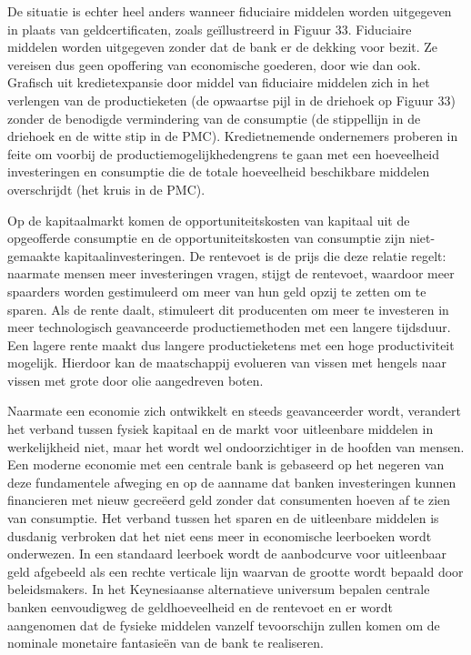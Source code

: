 De situatie is echter heel anders wanneer fiduciaire middelen worden uitgegeven in plaats van geldcertificaten, zoals geïllustreerd in Figuur 33. Fiduciaire middelen worden uitgegeven zonder dat de bank er de dekking voor bezit. Ze vereisen dus geen opoffering van economische goederen, door wie dan ook. Grafisch uit kredietexpansie door middel van fiduciaire middelen zich in het verlengen van de productieketen (de opwaartse pijl in de driehoek op Figuur 33) zonder de benodigde vermindering van de consumptie (de stippellijn in de driehoek en de witte stip in de PMC). Kredietnemende ondernemers proberen in feite om voorbij de productiemogelijkhedengrens te gaan met een hoeveelheid investeringen en consumptie die de totale hoeveelheid beschikbare middelen overschrijdt (het kruis in de PMC).

Op de kapitaalmarkt komen de opportuniteitskosten van kapitaal uit de opgeofferde consumptie en de opportuniteitskosten van consumptie zijn niet-gemaakte kapitaalinvesteringen. De rentevoet is de prijs die deze relatie regelt: naarmate mensen meer investeringen vragen, stijgt de rentevoet, waardoor meer spaarders worden gestimuleerd om meer van hun geld opzij te zetten om te sparen. Als de rente daalt, stimuleert dit producenten om meer te investeren in meer technologisch geavanceerde productiemethoden met een langere tijdsduur. Een lagere rente maakt dus langere productieketens met een hoge productiviteit mogelijk. Hierdoor kan de maatschappij evolueren van vissen met hengels naar vissen met grote door olie aangedreven boten.

Naarmate een economie zich ontwikkelt en steeds geavanceerder wordt, verandert het verband tussen fysiek kapitaal en de markt voor uitleenbare middelen in werkelijkheid niet, maar het wordt wel ondoorzichtiger in de hoofden van mensen. Een moderne economie met een centrale bank is gebaseerd op het negeren van deze fundamentele afweging en op de aanname dat banken investeringen kunnen financieren met nieuw gecreëerd geld zonder dat consumenten hoeven af te zien van consumptie. Het verband tussen het sparen en de uitleenbare middelen is dusdanig verbroken dat het niet eens meer in economische leerboeken wordt onderwezen. In een standaard leerboek wordt de aanbodcurve voor uitleenbaar geld afgebeeld als een rechte verticale lijn waarvan de grootte wordt bepaald door beleidsmakers. In het Keynesiaanse alternatieve universum bepalen centrale banken eenvoudigweg de geldhoeveelheid en de rentevoet en er wordt aangenomen dat de fysieke middelen vanzelf tevoorschijn zullen komen om de nominale monetaire fantasieën van de bank te realiseren.

